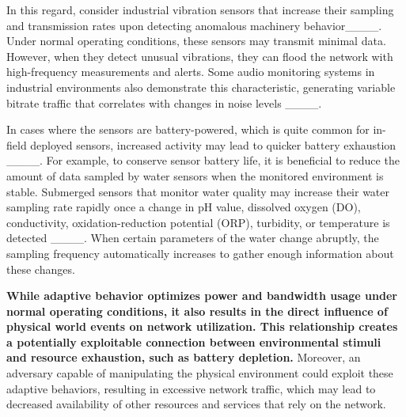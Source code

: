 In this regard, consider industrial vibration sensors that increase their sampling and transmission rates upon detecting anomalous machinery behavior____. 
Under normal operating conditions, these sensors may transmit minimal data. However, when they detect unusual vibrations, they can flood the network with high-frequency measurements and alerts.
Some audio monitoring systems in industrial environments also demonstrate this characteristic, generating variable bitrate traffic that correlates with changes in noise levels ____.

In cases where the sensors are battery-powered, which is quite common for in-field deployed sensors, increased activity may lead to quicker battery exhaustion ____. 
For example, to conserve sensor battery life, it is beneficial to reduce the amount of data sampled by water sensors when the monitored environment is stable. 
Submerged sensors that monitor water quality may increase their water sampling rate rapidly once a change in pH value, dissolved oxygen (DO), conductivity, oxidation-reduction potential (ORP), turbidity, or temperature is detected ____. When certain parameters of the water change abruptly, the sampling frequency automatically increases to gather enough information about these changes.


\textbf{While adaptive behavior optimizes power and bandwidth usage under normal operating conditions, it also results in the direct influence of physical world events on network utilization. 
This relationship creates a potentially exploitable connection between environmental stimuli and resource exhaustion, such as battery depletion.} 
Moreover, an adversary capable of manipulating the physical environment could exploit these adaptive behaviors, resulting in excessive network traffic, which may lead to decreased availability of other resources and services that rely on the network.